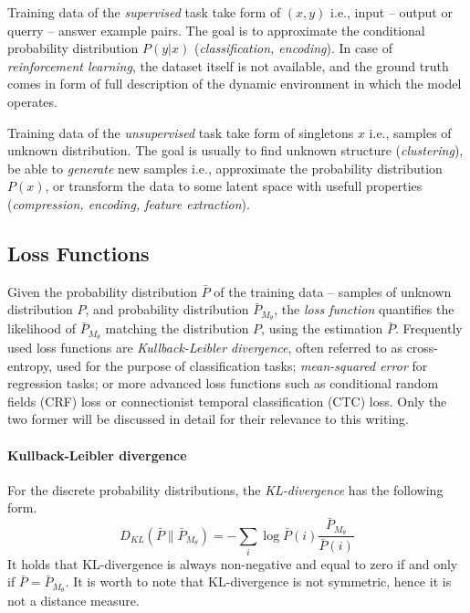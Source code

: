 Training data of the \emph{supervised} task take form of $(x,y)$ i.e., input -- output or querry -- answer example pairs. The goal is to approximate the conditional probability distribution $P\left(y|x\right)$ (\emph{classification, encoding}). In case of \emph{reinforcement learning}, the dataset itself is not available, and the ground truth comes in form of full description of the dynamic environment in which the model operates.

Training data of the \emph{unsupervised} task take form of singletons $x$ i.e., samples of unknown distribution. The goal is usually to find unknown structure (\emph{clustering}), be able to \emph{generate} new samples i.e., approximate the probability distribution $P(x)$, or transform the data to some latent space with usefull properties (\emph{compression, encoding, feature extraction}).

\subsection{Loss Functions}
\label{sec:loss_fnc}

Given the probability distribution $\bar{P}$ of the training data -- samples of unknown distribution $P$, and probability distribution $\bar{P}_{M_\theta}$, the \emph{loss function} quantifies the likelihood of $\bar{P}_{M_\theta}$ matching the distribution $P$, using the estimation $\bar{P}$. Frequently used loss functions are \emph{Kullback-Leibler divergence}, often referred to as cross-entropy, used for the purpose of classification tasks; \emph{mean-squared error} for regression tasks; or more advanced loss functions such as conditional random fields (CRF) loss or connectionist temporal classification (CTC) loss. Only the two former will be discussed in detail for their relevance to this writing.

\paragraph{Kullback-Leibler divergence}
For the discrete probability distributions, the \emph{KL-divergence} has the following form.
\begin{equation} \label{eqn:kl_divergence}
D_{KL}\left(\bar{P} \parallel \bar{P}_{M_\theta}\right) = - \sum\limits_{i} \log \bar{P}(i)\frac{\bar{P}_{M_\theta}}{\bar{P}(i)}
\end{equation}
It holds that KL-divergence is always non-negative and equal to zero if and only if $\bar{P} = \bar{P}_{M_\theta}$. It is worth to note that KL-divergence is not symmetric, hence it is not a distance measure.

